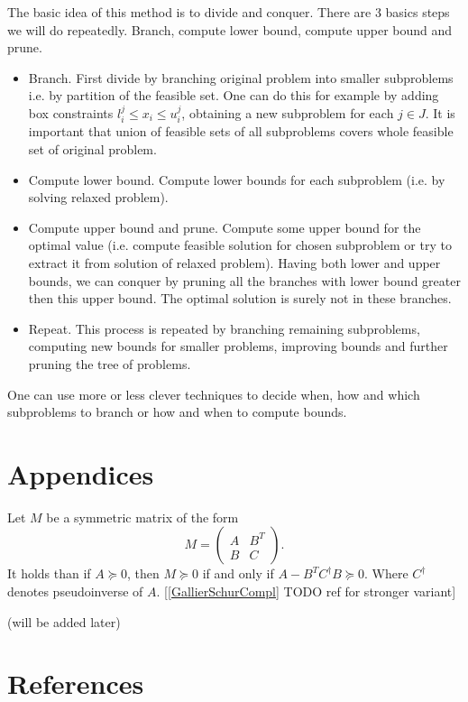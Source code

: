 \documentclass[10pt,oneside]{book}
\theoremstyle{definition}
\begin{document}
The basic idea of this method is to divide and conquer.
There are 3 basics steps we will do repeatedly. Branch, compute lower bound, compute upper bound and prune.
\begin{itemize}
\item Branch. First divide by branching original problem into smaller subproblems i.e. by partition of the feasible set. One can do this for example by adding box constraints $l^j_i\leq x_i \leq u^j_i$, obtaining a new subproblem for each $j\in J$.  It is important that union of feasible sets of all subproblems covers whole feasible set of original problem.
\item Compute lower bound. Compute lower bounds for each subproblem (i.e. by solving relaxed problem). 
\item Compute upper bound and prune. Compute some upper bound for the optimal value (i.e. compute feasible solution for chosen subproblem or try to extract it from solution of relaxed problem). Having both lower and upper bounds, we can conquer by pruning all the branches with lower bound greater then this upper bound. The optimal solution is surely not in these branches.
\item Repeat. This process is repeated by branching remaining subproblems, computing new bounds for smaller problems, improving bounds and further pruning the tree of problems.
\end{itemize}

One can use more or less clever techniques to decide when, how and which subproblems to branch or how and when to compute bounds.



\chapter{Appendices}

\label{SchurCompl}
Let $M$ be a symmetric matrix of the form
$$M = \left(\begin{array}{cc}
A & B^T\\
B & C
\end{array}\right).$$
It holds than if $A\succeq 0$, then $M\succeq 0$ if and only if $A-B^TC^{\dagger}B\succeq 0$. Where $C^\dagger$ denotes pseudoinverse of $A$. \rm [\ref{GallierSchurCompl} TODO ref for stronger variant]

\proof (will be added later)

\chapter*{References}
\end{document}
